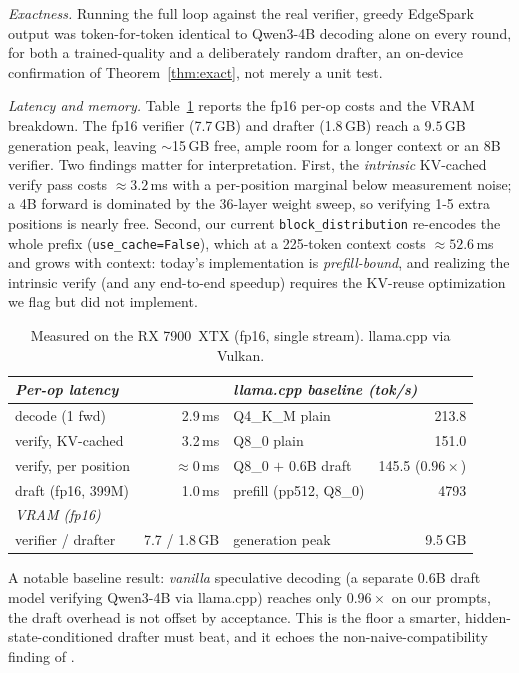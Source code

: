 \documentclass[11pt]{article}
\theoremstyle{plain}
\theoremstyle{definition}
\newcommand{\tokps}{tok/s}
\begin{document}
\emph{Exactness.} Running the full loop against the real verifier, greedy
EdgeSpark output was token-for-token identical to Qwen3-4B decoding alone on every
round, for both a trained-quality and a deliberately random drafter, an on-device
confirmation of Theorem~\ref{thm:exact}, not merely a unit test.

\emph{Latency and memory.} Table~\ref{tab:measured} reports the fp16 per-op costs
and the VRAM breakdown. The fp16 verifier (7.7\,GB) and drafter (1.8\,GB) reach a
$9.5$\,GB generation peak, leaving $\sim$15\,GB free, ample room for a longer
context or an 8B verifier. Two findings matter for interpretation. First, the
\emph{intrinsic} KV-cached verify pass costs $\approx 3.2$\,ms with a
per-position marginal below measurement noise; a 4B forward is dominated by the
36-layer weight sweep, so verifying 1-5 extra positions is nearly free. Second,
our current \texttt{block\_distribution} re-encodes the whole prefix
(\texttt{use\_cache=False}), which at a 225-token context costs
$\approx 52.6$\,ms and grows with context: today's implementation is
\emph{prefill-bound}, and realizing the intrinsic verify (and any end-to-end
speedup) requires the KV-reuse optimization we flag but did not implement.

\begin{table}[t]
\centering\small
\caption{Measured on the RX 7900~XTX (fp16, single stream). llama.cpp via Vulkan.}
\label{tab:measured}
\begin{tabular}{lr@{\hskip 18pt}lr}
\toprule
\multicolumn{2}{l}{\emph{Per-op latency}} & \multicolumn{2}{l}{\emph{llama.cpp baseline (\tokps)}}\\
\midrule
decode (1 fwd)        & 2.9\,ms  & Q4\_K\_M plain            & 213.8 \\
verify, KV-cached     & 3.2\,ms  & Q8\_0 plain               & 151.0 \\
verify, per position  & $\approx$0\,ms & Q8\_0 $+$ 0.6B draft & 145.5 ($0.96\times$) \\
draft (fp16, 399M)    & 1.0\,ms  & prefill (pp512, Q8\_0)    & 4793 \\
\midrule
\multicolumn{2}{l}{\emph{VRAM (fp16)}} & \multicolumn{2}{l}{} \\
verifier / drafter    & 7.7 / 1.8\,GB & generation peak      & 9.5\,GB \\
\bottomrule
\end{tabular}
\end{table}

A notable baseline result: \emph{vanilla} speculative decoding (a separate 0.6B
draft model verifying Qwen3-4B via llama.cpp) reaches only $0.96\times$ on our
prompts, the draft overhead is not offset by acceptance. This is the floor a
smarter, hidden-state-conditioned drafter must beat, and it echoes the
non-naive-compatibility finding of \citet{zhang2025}.
\end{document}
